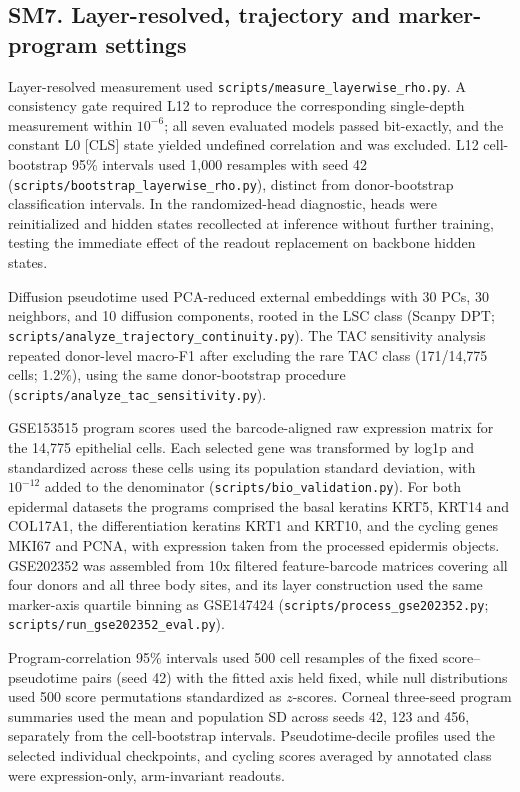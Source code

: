 \documentclass[12pt,a4paper]{article}
\begin{document}
\subsection*{SM7. Layer-resolved, trajectory and marker-program settings}
Layer-resolved measurement used \texttt{scripts/measure\_layerwise\_rho.py}. A consistency gate required L12 to reproduce the corresponding single-depth measurement within $10^{-6}$; all seven evaluated models passed bit-exactly, and the constant L0 [CLS] state yielded undefined correlation and was excluded. L12 cell-bootstrap 95\% intervals used 1,000 resamples with seed 42 (\texttt{scripts/bootstrap\_layerwise\_rho.py}), distinct from donor-bootstrap classification intervals. In the randomized-head diagnostic, heads were reinitialized and hidden states recollected at inference without further training, testing the immediate effect of the readout replacement on backbone hidden states.

Diffusion pseudotime used PCA-reduced external embeddings with 30 PCs, 30 neighbors, and 10 diffusion components, rooted in the LSC class (Scanpy DPT; \texttt{scripts/analyze\_trajectory\_continuity.py}). The TAC sensitivity analysis repeated donor-level macro-F1 after excluding the rare TAC class (171/14,775 cells; 1.2\%), using the same donor-bootstrap procedure (\texttt{scripts/analyze\_tac\_sensitivity.py}).

GSE153515 program scores used the barcode-aligned raw expression matrix for the 14,775 epithelial cells. Each selected gene was transformed by log1p and standardized across these cells using its population standard deviation, with $10^{-12}$ added to the denominator (\texttt{scripts/bio\_validation.py}). For both epidermal datasets the programs comprised the basal keratins KRT5, KRT14 and COL17A1, the differentiation keratins KRT1 and KRT10, and the cycling genes MKI67 and PCNA, with expression taken from the processed epidermis objects. GSE202352 was assembled from 10x filtered feature-barcode matrices covering all four donors and all three body sites, and its layer construction used the same marker-axis quartile binning as GSE147424 (\texttt{scripts/process\_gse202352.py}; \texttt{scripts/run\_gse202352\_eval.py}).

Program-correlation 95\% intervals used 500 cell resamples of the fixed score--pseudotime pairs (seed 42) with the fitted axis held fixed, while null distributions used 500 score permutations standardized as $z$-scores. Corneal three-seed program summaries used the mean and population SD across seeds 42, 123 and 456, separately from the cell-bootstrap intervals. Pseudotime-decile profiles used the selected individual checkpoints, and cycling scores averaged by annotated class were expression-only, arm-invariant readouts.
\end{document}
